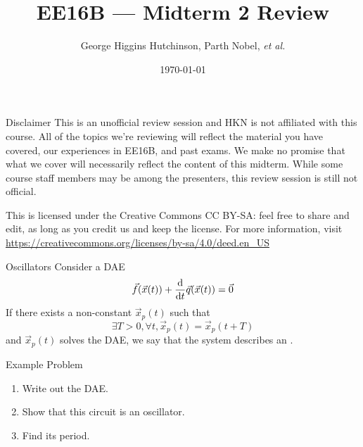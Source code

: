 \documentclass{beamer}
\title{EE16B --- Midterm 2 Review}
\author{George Higgins Hutchinson, Parth Nobel, \textit{et al.}}
\date{\today}
\begin{document}
	\begin{frame}
		\titlepage
	\end{frame}

	\begin{frame}{Disclaimer}
	This is an unofficial review session and HKN is not affiliated with this course. All of the topics we're reviewing will reflect the material you have covered, our experiences in EE16B, and past exams. We make no promise that what we cover will necessarily reflect the content of this midterm. While some course staff members may be among the presenters, this review session is still not official.
	\vspace{1em}
	
	This is licensed under the Creative Commons CC BY-SA: feel free to share and edit, as long as you credit us and keep the license. For more information, visit \\ \small{\url{https://creativecommons.org/licenses/by-sa/4.0/deed.en_US}}
	
	\end{frame}

    \begin{frame}{Oscillators}
        Consider a DAE \[
            \vec f(\vec x(t)) + \ddt{} \vec q(\vec x(t)) = \vec 0
        \]
        If there exists a non-constant \(\vec x_p(t)\) such that \[
            \exists T> 0,\forall t, \vec x_p(t) = \vec x_p(t + T)
        \] and \(\vec x_p(t)\) solves the DAE, we say that the system describes an .
    \end{frame}

    \begin{frame}{Example Problem}
        \begin{center}
        \end{center}
        \begin{enumerate}
            \item Write out the DAE.
            \item Show that this circuit is an oscillator.
            \item Find its period.
        \end{enumerate}
    \end{frame}
\end{document}
